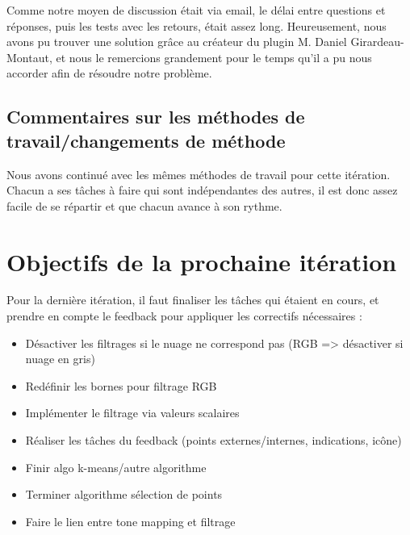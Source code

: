 \documentclass[12pt,titlepage,french]{article}
\begin{document}
Comme notre moyen de discussion était via email, le délai entre questions et réponses, puis les tests avec les retours, était assez long. Heureusement, nous avons pu trouver une solution grâce au créateur du plugin M. Daniel Girardeau-Montaut, et nous le remercions grandement pour le temps qu'il a pu nous accorder afin de résoudre notre problème.

\subsection{Commentaires sur les méthodes de travail/changements de méthode}

Nous avons continué avec les mêmes méthodes de travail pour cette itération. Chacun a ses tâches à faire qui sont indépendantes des autres, il est donc assez facile de se répartir et que chacun avance à son rythme.

\section{Objectifs de la prochaine itération}

Pour la dernière itération, il faut finaliser les tâches qui étaient en cours, et prendre en compte le feedback pour appliquer les correctifs nécessaires :

\begin{itemize}
    \item Désactiver les filtrages si le nuage ne correspond pas (RGB => désactiver si nuage en gris)
    \item Redéfinir les bornes pour filtrage RGB
    \item Implémenter le filtrage via valeurs scalaires
    \item Réaliser les tâches du feedback (points externes/internes, indications, icône)
    \item Finir algo k-means/autre algorithme
    \item Terminer algorithme sélection de points
    \item Faire le lien entre tone mapping et filtrage
\end{itemize}
\end{document}
